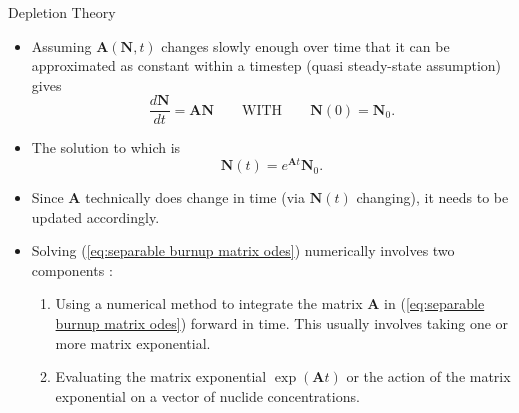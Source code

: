 \documentclass[9pt,t,aspectratio=169]{beamer}
\newcommand{\QWITH}{\qquad \text{WITH} \qquad}
\begin{document}
\begin{frame}{Depletion Theory}
    \begin{itemize}
        \item Assuming $\textbf{A}(\textbf{N},t)$ changes slowly enough over time that it can be approximated as constant within a timestep (quasi steady-state assumption) gives
        \begin{equation} \label{eq:separable burnup matrix odes}
            \frac{d\textbf{N}}{dt} =
            \textbf{A} \textbf{N}
            \QWITH
            \textbf{N}(0) = \textbf{N}_{0}.
        \end{equation}
        \item The solution to which is
        \begin{equation} \label{eq:separation solution}
            \textbf{N}(t) = e^{\textbf{A}t} \textbf{N}_{0}.
        \end{equation}
        \item Since \textbf{A} technically does change in time (via $\textbf{N}(t)$ changing), it needs to be updated accordingly.
        \vspace*{0.4cm}
        \item Solving (\ref{eq:separable burnup matrix odes}) numerically involves two components \cite{romano-depletion-2021}:
        \begin{enumerate}
            \item Using a numerical method to integrate the matrix $\textbf{A}$ in (\ref{eq:separable burnup matrix odes}) forward in time. This usually involves taking one or more matrix exponential.
            \item Evaluating the matrix exponential $\exp(\textbf{A}t)$ or the action of the matrix exponential on a vector of nuclide concentrations.
        \end{enumerate}
    \end{itemize}
\end{frame}
\end{document}
